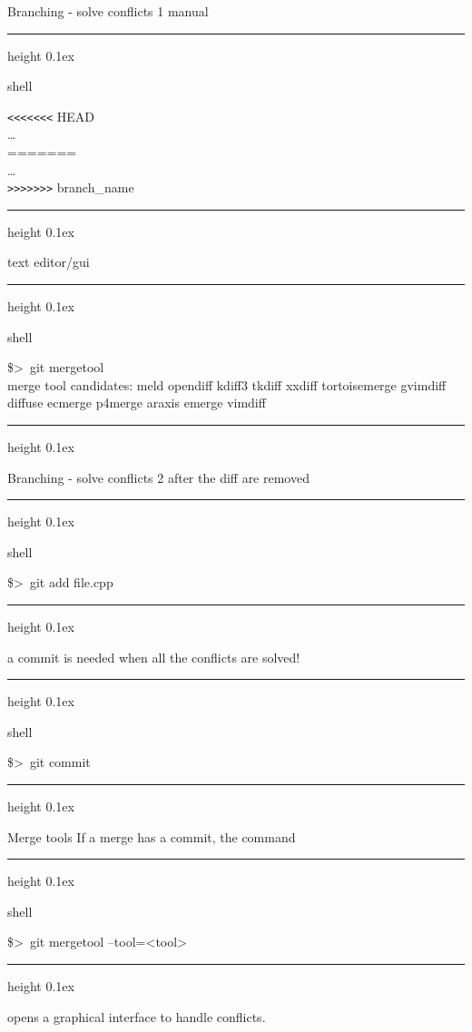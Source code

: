 \documentclass{beamer}
\newenvironment{shell}{%
\footnotesize\flushleft\hrule height 0.1ex
\tt\begin{beamercolorbox}[sep=1ex,left]{shell}%
}{%
\end{beamercolorbox}
\hrule height 0.1ex
\endflushleft\par
}
\newcommand*{\psone}[1][ant]{\$>~}
\begin{document}
\begin{frame}[fragile]{Branching  - solve conflicts 1}
manual
\begin{shell}
\verb!<<<<<<<! HEAD\\
\ldots\\
=======\\
\ldots\\
\verb!>>>>>>>! branch_name\\
\end{shell}
\pause
text editor/gui
\begin{shell}
\psone git mergetool\\
merge tool candidates: meld opendiff kdiff3 tkdiff xxdiff tortoisemerge gvimdiff diffuse ecmerge p4merge araxis emerge vimdiff
\end{shell}
\end{frame}
\begin{frame}[fragile]{Branching  - solve conflicts 2}
after the diff are removed
\begin{shell}
\psone git add file.cpp
\end{shell}
a commit is needed when all the conflicts are solved!
\begin{shell}
\psone git commit
\end{shell}
\end{frame}
%
\begin{frame}{Merge tools}
If a merge has a commit, the command
\begin{shell}
\psone git mergetool --tool=<tool>
\end{shell}

opens a graphical interface to handle conflicts.
\end{frame}
\end{document}
